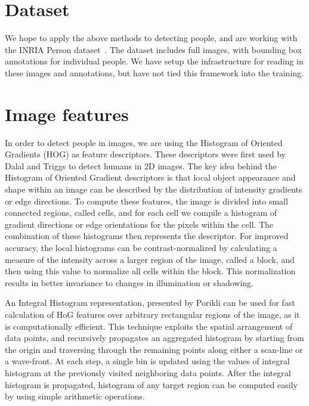 \documentclass[11pt]{article}
\begin{document}
\section{Dataset}

We hope to apply the above methods to detecting people, and are working with the INRIA Person dataset~\cite{HoG}. The dataset includes full images, with bounding box annotations for individual people. We have setup the infrastructure for reading in these images and annotations, but have not tied this framework into the training.

\section{Image features}

In order to detect people in images, we are using the Histogram of Oriented Gradients (HOG) as feature descriptors. These descriptors were first used by Dalal and Triggs \cite{HoG} to detect humans in 2D images. The key idea behind the Histogram of Oriented Gradient descriptors is that local object appearance and shape within an image can be described by the distribution of intensity gradients or edge directions. To compute these features, the image is divided into small connected regions, called cells, and for each cell we compile a histogram of gradient directions or edge orientations for the pixels within the cell. The combination of these histograms then represents the descriptor. For improved accuracy, the local histograms can be contrast-normalized by calculating a measure of the intensity across a larger region of the image, called a block, and then using this value to normalize all cells within the block. This normalization results in better invariance to changes in illumination or shadowing.

An Integral Histogram representation, presented by Porikli \cite{IntHist} can be used for fast calculation of HoG features over arbitrary rectangular regions of the image, as it is computationally efficient. This technique exploits the spatial arrangement of data points, and recursively propagates an aggregated histogram by starting from the origin and traversing through the remaining points along either a scan-line or a wave-front. At each step, a single bin is updated using the values of integral histogram at the previously visited neighboring data points. After the integral histogram is propagated, histogram of any target region can be computed easily by using simple arithmetic operations.
\end{document}
